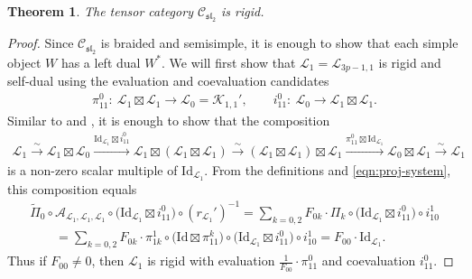 \documentclass[pdftex]{sigma}
\numberwithin{equation}{section}
\newtheorem{Theorem}{Theorem}[section]
\theoremstyle{definition}
\begin{document}
\begin{Theorem}\label{thm:Csl2-rigid}
The tensor category $\mathcal{C}_{\mathfrak{sl}_2}$ is rigid.
\end{Theorem}
\begin{proof}
Since $\mathcal{C}_{\mathfrak{sl}_2}$ is braided and semisimple, it is enough to show that each simple object $W$ has a left dual $W^*$. We will first show that $\mathcal{L}_1=\mathcal{L}_{3p-1,1}$ is rigid and self-dual using the evaluation and coevaluation candidates
\begin{gather*}
\pi^0_{11}\colon\ \mathcal{L}_1\boxtimes\mathcal{L}_1\longrightarrow\mathcal{L}_0=\mathcal{K}_{1,1}',\qquad i^0_{11}\colon\ \mathcal{L}_0\longrightarrow\mathcal{L}_1\boxtimes\mathcal{L}_1.
\end{gather*}
Similar to \cite[Lemma 4.2.1]{CMY3} and \cite[Lemma 2.1]{EP}, it is enough to show that the composition
\begin{gather*}
\mathcal{L}_1\xrightarrow{\sim} \mathcal{L}_1\boxtimes\mathcal{L}_0\xrightarrow{\mathrm{Id}_{\mathcal{L}_1}\boxtimes i^0_{11}} \mathcal{L}_1\boxtimes(\mathcal{L}_1\boxtimes\mathcal{L}_1)\xrightarrow{\sim}(\mathcal{L}_1\boxtimes\mathcal{L}_1)\boxtimes\mathcal{L}_1\xrightarrow{\pi^0_{11}\boxtimes\mathrm{Id}_{\mathcal{L}_1}}\mathcal{L}_0\boxtimes\mathcal{L}_1\xrightarrow{\sim}\mathcal{L}_1
\end{gather*}
is a non-zero scalar multiple of $\mathrm{Id}_{\mathcal{L}_1}$. From the definitions and \eqref{eqn:proj-system}, this composition equals
\begin{gather*}
\widetilde{\Pi}_0\circ\mathcal{A}_{\mathcal{L}_1,\mathcal{L}_1,\mathcal{L}_1} \circ\bigl(\mathrm{Id}_{\mathcal{L}_1}\boxtimes i^0_{11}\bigr)\circ (r_{\mathcal{L}_1}')^{-1} =\sum_{k=0,2} F_{0k}\cdot\Pi_k\circ\bigl(\mathrm{Id}_{\mathcal{L}_1}\boxtimes i^0_{11}\bigr)\circ i^1_{10}\\
\qquad =\sum_{k=0,2} F_{0k}\cdot\pi^1_{1k}\circ\bigl(\mathrm{Id}\boxtimes\pi^k_{11}\bigr)\circ\bigl(\mathrm{Id}_{\mathcal{L}_1}\boxtimes i^0_{11}\bigr)\circ i^1_{10} =F_{00}\cdot\mathrm{Id}_{\mathcal{L}_1}.
\end{gather*}
Thus if $F_{00}\neq 0$, then $\mathcal{L}_1$ is rigid with evaluation $\frac{1}{F_{00}}\cdot\pi^0_{11}$ and coevaluation $i^0_{11}$.






\end{proof}
\end{document}
